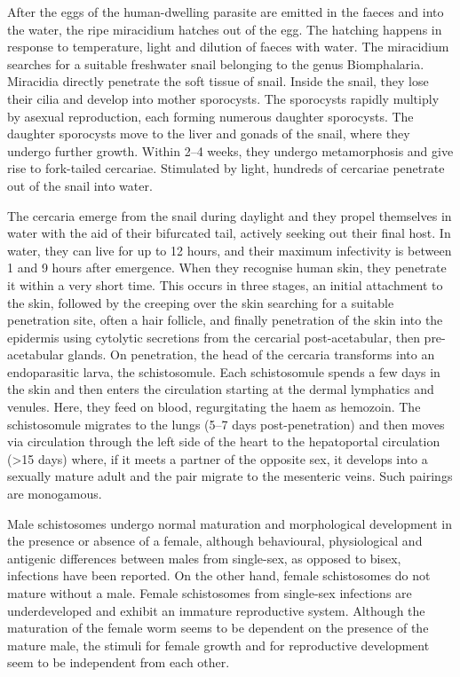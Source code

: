 \documentclass[]{book}
\theoremstyle{definition}
\theoremstyle{definition}
\theoremstyle{definition}
\theoremstyle{remark}
\begin{document}
After the eggs of the human-dwelling parasite are emitted in the faeces
and into the water, the ripe miracidium hatches out of the egg. The
hatching happens in response to temperature, light and dilution of
faeces with water. The miracidium searches for a suitable freshwater
snail belonging to the genus Biomphalaria. Miracidia directly penetrate
the soft tissue of snail. Inside the snail, they lose their cilia and
develop into mother sporocysts. The sporocysts rapidly multiply by
asexual reproduction, each forming numerous daughter sporocysts. The
daughter sporocysts move to the liver and gonads of the snail, where
they undergo further growth. Within 2--4 weeks, they undergo
metamorphosis and give rise to fork-tailed cercariae. Stimulated by
light, hundreds of cercariae penetrate out of the snail into water.

The cercaria emerge from the snail during daylight and they propel
themselves in water with the aid of their bifurcated tail, actively
seeking out their final host. In water, they can live for up to 12
hours, and their maximum infectivity is between 1 and 9 hours after
emergence. When they recognise human skin, they penetrate it within a
very short time. This occurs in three stages, an initial attachment to
the skin, followed by the creeping over the skin searching for a
suitable penetration site, often a hair follicle, and finally
penetration of the skin into the epidermis using cytolytic secretions
from the cercarial post-acetabular, then pre-acetabular glands. On
penetration, the head of the cercaria transforms into an endoparasitic
larva, the schistosomule. Each schistosomule spends a few days in the
skin and then enters the circulation starting at the dermal lymphatics
and venules. Here, they feed on blood, regurgitating the haem as
hemozoin. The schistosomule migrates to the lungs (5--7 days
post-penetration) and then moves via circulation through the left side
of the heart to the hepatoportal circulation (\textgreater{}15 days)
where, if it meets a partner of the opposite sex, it develops into a
sexually mature adult and the pair migrate to the mesenteric veins. Such
pairings are monogamous.

Male schistosomes undergo normal maturation and morphological
development in the presence or absence of a female, although
behavioural, physiological and antigenic differences between males from
single-sex, as opposed to bisex, infections have been reported. On the
other hand, female schistosomes do not mature without a male. Female
schistosomes from single-sex infections are underdeveloped and exhibit
an immature reproductive system. Although the maturation of the female
worm seems to be dependent on the presence of the mature male, the
stimuli for female growth and for reproductive development seem to be
independent from each other.
\end{document}

